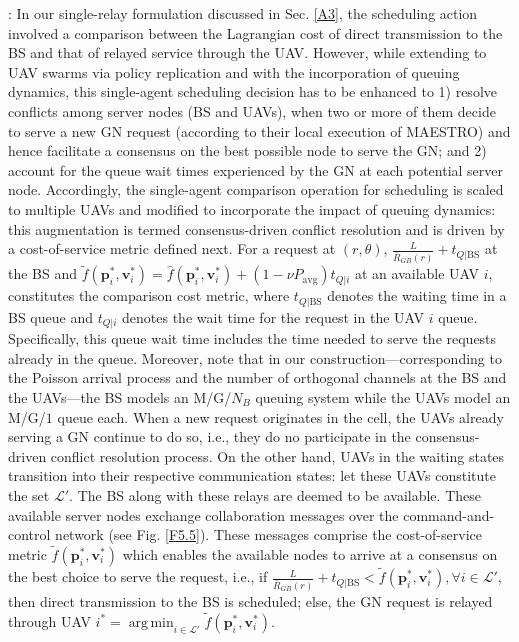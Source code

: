 \documentclass[10pt, twocolumn]{IEEEtran}
\theoremstyle{plain}
\theoremstyle{definition}
\theoremstyle{remark}
\DeclareMathOperator*{\argmin}{arg\,min}
\begin{document}
: In our single-relay formulation discussed in Sec. \ref{A3}, the scheduling action involved a comparison between the Lagrangian cost of direct transmission to the BS and that of relayed service through the UAV. However, while extending to UAV swarms via policy replication and with the incorporation of queuing dynamics, this single-agent scheduling decision has to be enhanced to 1) resolve conflicts among server nodes (BS and UAVs), when two or more of them decide to serve a new GN request (according to their local execution of MAESTRO) and hence facilitate a consensus on the best possible node to serve the GN; and 2) account for the queue wait times experienced by the GN at each potential server node. Accordingly, the single-agent comparison operation for scheduling is scaled to multiple UAVs and modified to incorporate the impact of queuing dynamics: this augmentation is termed consensus-driven conflict resolution and is driven by a cost-of-service metric defined next. For a request at $(r,\theta)$, $\frac{L}{\bar{R}_{GB}(r)}{+}t_{Q|\text{BS}}$ at the BS and $\tilde{f}(\mathbf{p}_{i}^{*},\mathbf{v}_{i}^{*}){=}\hat{f}(\mathbf{p}_{i}^{*},\mathbf{v}_{i}^{*}){+}(1{-}\nu P_{\mathrm{avg}})t_{Q|i}$ at an available UAV $i$, constitutes the comparison cost metric, where $t_{Q|\text{BS}}$ denotes the waiting time in a BS queue and $t_{Q|i}$ denotes the wait time for the request in the UAV $i$ queue. Specifically, this queue wait time includes the time needed to serve the requests already in the queue. Moreover, note that in our construction---corresponding to the Poisson arrival process and the number of orthogonal channels at the BS and the UAVs---the BS models an M/G/$N_{B}$ queuing system while the UAVs model an M/G/$1$ queue each. When a new request originates in the cell, the UAVs already serving a GN continue to do so, i.e., they do no participate in the consensus-driven conflict resolution process. On the other hand, UAVs in the {waiting} states transition into their respective {communication} states: let these UAVs constitute the set $\mathcal{L}'$. The BS along with these relays are deemed to be available. These available server nodes exchange collaboration messages over the command-and-control network (see Fig. \ref{F5.5}). These messages comprise the cost-of-service metric $\tilde{f}(\mathbf{p}_{i}^{*},\mathbf{v}_{i}^{*})$ which enables the available nodes to arrive at a consensus on the best choice to serve the request, i.e., if $\frac{L}{\bar{R}_{GB}(r)}{+}t_{Q|\text{BS}}{<}\tilde{f}(\mathbf{p}_{i}^{*},\mathbf{v}_{i}^{*}),{\forall}i{\in}\mathcal{L}'$, then direct transmission to the BS is scheduled; else, the GN request is relayed through UAV $i^{*}{=}\argmin_{i{\in}\mathcal{L}'}\tilde{f}(\mathbf{p}_{i}^{*},\mathbf{v}_{i}^{*})$.
\vspace{-2mm}
\end{document}
